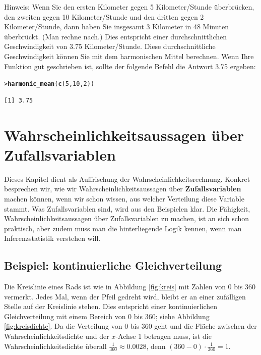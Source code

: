 \documentclass[oneside, 10pt]{book}\usepackage[]{graphicx}\usepackage[]{xcolor}
\makeatletter
\newcommand{\hlnum}[1]{\textcolor[rgb]{0.686,0.059,0.569}{#1}}%
\newcommand{\hlstd}[1]{\textcolor[rgb]{0.345,0.345,0.345}{#1}}%
\newcommand{\hlkwd}[1]{\textcolor[rgb]{0.737,0.353,0.396}{\textbf{#1}}}%
\newenvironment{kframe}{%
 \def\at@end@of@kframe{}%
 \ifinner\ifhmode%
  \def\at@end@of@kframe{\end{minipage}}%
  \begin{minipage}{\columnwidth}%
 \fi\fi%
 \def\FrameCommand##1{\hskip\@totalleftmargin \hskip-\fboxsep
 \colorbox{shadecolor}{##1}\hskip-\fboxsep
     \hskip-\linewidth \hskip-\@totalleftmargin \hskip\columnwidth}%
 \MakeFramed {\advance\hsize-\width
   \@totalleftmargin\z@ \linewidth\hsize
   \@setminipage}}%
 {\par\unskip\endMakeFramed%
 \at@end@of@kframe}
\newenvironment{knitrout}{}{} %
\makeatother
\begin{document}
\begin{enumerate}
    
    Hinweis: Wenn Sie den ersten Kilometer gegen 5 Kilometer/Stunde
    überbrücken, den zweiten gegen 10 Kilometer/Stunde
    und den dritten gegen 2 Kilometer/Stunde, dann haben Sie insgesamt
    3 Kilometer in 48 Minuten überbrückt. (Man rechne nach.)
    Dies entspricht einer durchschnittlichen Geschwindigkeit von 3.75
    Kilometer/Stunde.
    Diese durchschnittliche Geschwindigkeit können
    Sie mit dem harmonischen Mittel berechnen. Wenn Ihre Funktion
    gut geschrieben ist, sollte der folgende Befehl die Antwort 3.75 ergeben:
\begin{knitrout}
\color{fgcolor}\begin{kframe}
\begin{alltt}
\hlstd{> }\hlkwd{harmonic_mean}\hlstd{(}\hlkwd{c}\hlstd{(}\hlnum{5}\hlstd{,} \hlnum{10}\hlstd{,} \hlnum{2}\hlstd{))}
\end{alltt}
\begin{verbatim}
[1] 3.75
\end{verbatim}
\end{kframe}
\end{knitrout}


\end{enumerate}


\chapter{Wahrscheinlichkeitsaussagen über Zufallsvariablen}\label{ch:wahrscheinlichkeiten}

Dieses Kapitel dient als Auffrischung der Wahrscheinlichkeitsrechnung.
Konkret besprechen wir, wie wir Wahrscheinlichkeitsaussagen über 
\textbf{Zufallsvariablen} machen können, wenn wir schon wissen, 
aus welcher Verteilung diese Variable stammt. Was Zufallsvariablen
sind, wird aus den Beispielen klar. Die Fähigkeit, 
Wahrscheinlichkeitsaussagen über Zufallsvariablen zu machen, 
ist an sich schon praktisch, aber zudem muss man die 
hinterliegende Logik kennen, wenn man Inferenzstatistik verstehen will.

\section{Beispiel: kontinuierliche Gleichverteilung}\label{sec:continuousuniform}
Die Kreislinie eines Rads ist wie in Abbildung \ref{fig:kreis} 
mit Zahlen von 0 bis 360 vermerkt. Jedes Mal, wenn der Pfeil 
gedreht wird, bleibt er an einer zufälligen Stelle auf der 
Kreislinie stehen. Dies entspricht einer kontinuierlichen 
Gleichverteilung mit einem Bereich von 0 bis 360; siehe Abbildung
\ref{fig:kreisdichte}.
Da die Verteilung von 0 bis 360 geht und die Fläche zwischen der Wahrscheinlichkeitsdichte und der $x$-Achse 1 betragen muss,
ist die Wahrscheinlichkeitsdichte überall $\frac{1}{360} \approx 0.0028$,
denn $(360-0) \cdot \frac{1}{360} = 1$.
\end{document}
